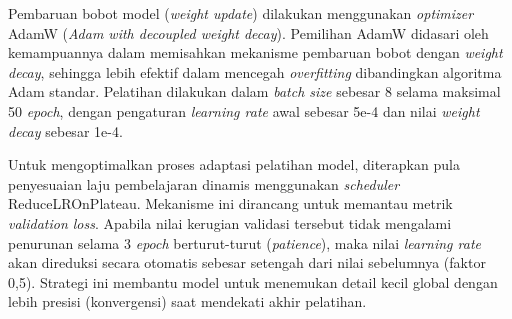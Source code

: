 Pembaruan bobot model (\textit{weight update}) dilakukan menggunakan \textit{optimizer} AdamW (\textit{Adam with decoupled weight decay}).
Pemilihan AdamW didasari oleh kemampuannya dalam memisahkan mekanisme pembaruan bobot dengan \textit{weight decay}, sehingga lebih efektif dalam mencegah \textit{overfitting} dibandingkan algoritma Adam standar.
Pelatihan dilakukan dalam \textit{batch size} sebesar 8 selama maksimal 50 \textit{epoch}, dengan pengaturan \textit{learning rate} awal sebesar 5e-4 dan nilai \textit{weight decay} sebesar 1e-4. \par

Untuk mengoptimalkan proses adaptasi pelatihan model, diterapkan pula penyesuaian laju pembelajaran dinamis menggunakan \textit{scheduler} ReduceLROnPlateau.
Mekanisme ini dirancang untuk memantau metrik \textit{validation loss}.
Apabila nilai kerugian validasi tersebut tidak mengalami penurunan selama 3 \textit{epoch} berturut-turut (\textit{patience}), maka nilai \textit{learning rate} akan direduksi secara otomatis sebesar setengah dari nilai sebelumnya (faktor 0,5).
Strategi ini membantu model untuk menemukan detail kecil global dengan lebih presisi (konvergensi) saat mendekati akhir pelatihan.

